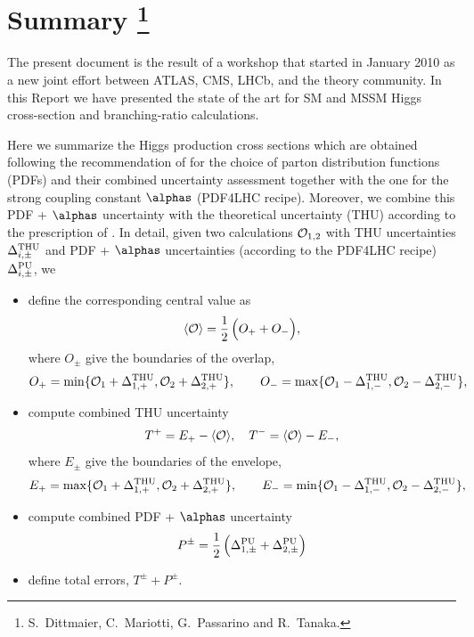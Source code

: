 \section{Summary%
\footnote{S.~Dittmaier, C.~Mariotti, G.~Passarino and R.~Tanaka.}}
\label{se:summary}

The present document is the result of a workshop that started in
January 2010 as a new joint effort between ATLAS, CMS, LHCb, and the
theory community.
In this Report we have presented the state of the art for SM and MSSM
Higgs cross-section and branching-ratio calculations.

Here we summarize the Higgs production cross sections which are obtained
following the recommendation of  for the choice of
parton distribution functions (PDFs) and their combined uncertainty assessment
together with the one for the strong coupling constant $\alphas$ 
(PDF4LHC recipe).
Moreover, we combine this PDF + $\alphas$ uncertainty with the
theoretical uncertainty (THU) according to the prescription of
.
In detail, given two calculations ${\cal O}_{1,2}$ with THU uncertainties
$\Delta^{\rm THU}_{i,\pm}$ and PDF + $\alphas$ uncertainties (according
to the PDF4LHC recipe) $\Delta^{\rm PU}_{i,\pm}$, we
\begin{itemize}

\item define the corresponding central value as
\begin{equation}
\langle {\cal O}\rangle = \frac{1}{2}\,\Bigl(
O_+ + O_- \Bigr),
\end{equation}
where $O_{\pm}$ give the boundaries of the overlap,
\begin{equation}
O_+ = \min\{ {\cal O}_{1} + \Delta^{\rm THU}_{1,+},
              {\cal O}_{2} + \Delta^{\rm THU}_{2,+} \}, \qquad
O_- = \max\{ {\cal O}_{1} - \Delta^{\rm THU}_{1,-},
             {\cal O}_{2} - \Delta^{\rm THU}_{2,-} \},
\end{equation}
\item compute combined THU uncertainty
\begin{equation}
T^+ = E_{+} - \langle {\cal O}\rangle,
\quad
T^- = \langle {\cal O}\rangle - E_{-},
\end{equation}
where $E_{\pm}$ give the boundaries of the envelope,
\begin{equation}
E_+ = \max\{ {\cal O}_{1} + \Delta^{\rm THU}_{1,+},
             {\cal O}_{2} + \Delta^{\rm THU}_{2,+} \}, \qquad
E_- = \min\{ {\cal O}_{1} - \Delta^{\rm THU}_{1,-},
             {\cal O}_{2} - \Delta^{\rm THU}_{2,-} \},
\end{equation}
\item compute combined PDF + $\alphas$ uncertainty
\begin{equation}
P^{\pm} = \frac{1}{2}\,\Bigl( \Delta^{\rm PU}_{1,\pm} +
\Delta^{\rm PU}_{2,\pm}\Bigr)
\end{equation}
\item define total errors, $T^{\pm} + P^{\pm}$.

\end{itemize}

